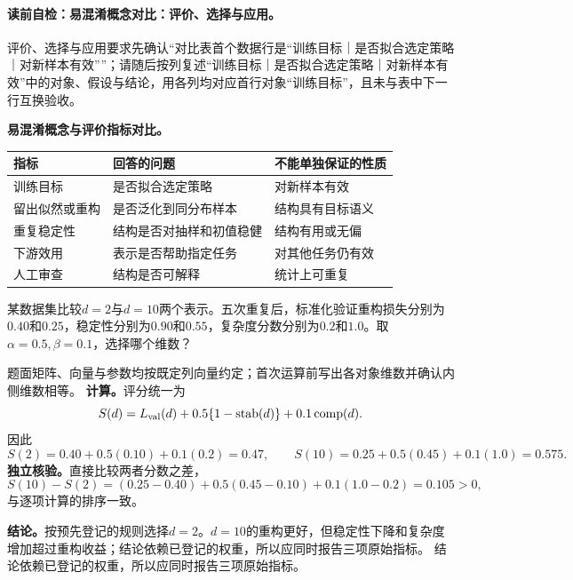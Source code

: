 \label{struct:V4-C01-CH31}
\paragraph{读前自检：易混淆概念对比：评价、选择与应用。}评价、选择与应用要求先确认“对比表首个数据行是“训练目标｜是否拟合选定策略｜对新样本有效””；请随后按列复述“训练目标｜是否拟合选定策略｜对新样本有效”中的对象、假设与结论，用各列均对应首行对象“训练目标”，且未与表中下一行互换验收。\par

\begin{comparisonbox}
\textbf{易混淆概念与评价指标对比。}\par\smallskip
\begin{tabularx}{\linewidth}{@{}l X X@{}}
\toprule 指标 & 回答的问题 & 不能单独保证的性质\\ \midrule
训练目标 & 是否拟合选定策略 & 对新样本有效\\
留出似然或重构 & 是否泛化到同分布样本 & 结构具有目标语义\\
重复稳定性 & 结构是否对抽样和初值稳健 & 结构有用或无偏\\
下游效用 & 表示是否帮助指定任务 & 对其他任务仍有效\\
人工审查 & 结构是否可解释 & 统计上可重复\\
\bottomrule
\end{tabularx}
\end{comparisonbox}

\label{struct:V4-C01-CH18}
\label{struct:V4-C01-CH32}
\begin{example}[两个候选表示维数的选择]\label{exm:V4-C01-model-choice}
某数据集比较$d=2$与$d=10$两个表示。五次重复后，标准化验证重构损失分别为$0.40$和$0.25$，稳定性分别为$0.90$和$0.55$，复杂度分数分别为$0.2$和$1.0$。取$\alpha=0.5,\beta=0.1$，选择哪个维数？

\label{struct:V4-C01-CH33}
\end{example}
\begin{solution}
\SolGiven 题面矩阵、向量与参数均按既定列向量约定；首次运算前写出各对象维数并确认内侧维数相等。
\SolDerive
\textbf{计算。}评分统一为
\[
S(d)=L_{\rm val}(d)+0.5\{1-\operatorname{stab}(d)\}+0.1\operatorname{comp}(d).
\]
因此
\[
S(2)=0.40+0.5(0.10)+0.1(0.2)=0.47,
\qquad
S(10)=0.25+0.5(0.45)+0.1(1.0)=0.575.
\]
\textbf{独立核验。}直接比较两者分数之差，
\[
S(10)-S(2)=(0.25-0.40)+0.5(0.45-0.10)+0.1(1.0-0.2)
=0.105>0,
\]
与逐项计算的排序一致。

\textbf{结论。}按预先登记的规则选择$d=2$。$d=10$的重构更好，但稳定性下降和复杂度增加超过重构收益；结论依赖已登记的权重，所以应同时报告三项原始指标。
\SolAnswer 结论依赖已登记的权重，所以应同时报告三项原始指标。
\end{solution}

